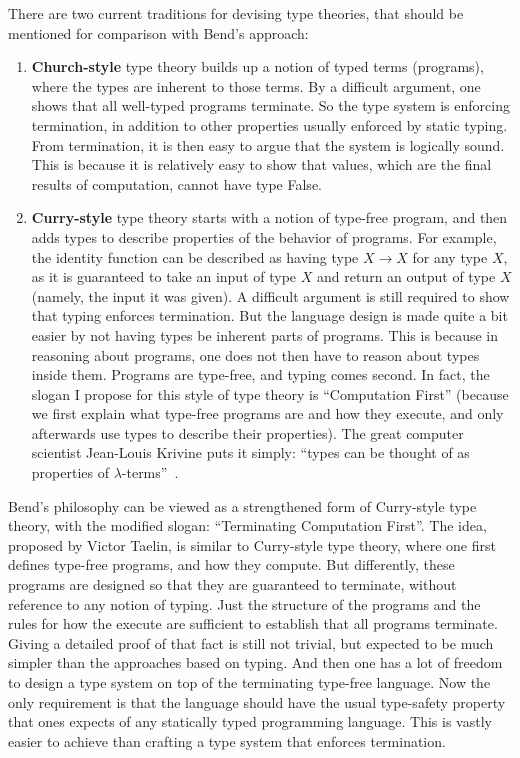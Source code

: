 \documentclass{article}
\begin{document}
There are two current traditions for devising type theories, that
should be mentioned for comparison with Bend's approach:

\begin{enumerate}
\item \textbf{Church-style} type theory builds up a notion of typed
  terms (programs), where the types are inherent to those terms.  By a
  difficult argument, one shows that all well-typed programs
  terminate.  So the type system is enforcing termination, in addition
  to other properties usually enforced by static typing.  From
  termination, it is then easy to argue that the system is logically
  sound.  This is because it is relatively easy to show that values,
  which are the final results of computation, cannot have type False.

\item \textbf{Curry-style} type theory starts with a notion of
  type-free program, and then adds types to describe properties of the
  behavior of programs.  For example, the identity function can be
  described as having type $X \to X$ for any type $X$, as it is
  guaranteed to take an input of type $X$ and return an output of type
  $X$ (namely, the input it was given).  A difficult argument is still
  required to show that typing enforces termination.  But the language
  design is made quite a bit easier by not having types be inherent
  parts of programs.  This is because in reasoning about programs,
  one does not then have to reason about types inside them.  Programs
  are type-free, and typing comes second.  In fact, the slogan I propose
  for this style of type theory is ``Computation First'' (because we
  first explain what type-free programs are and how they execute, and
  only afterwards use types to describe their properties).  The great
  computer scientist Jean-Louis Krivine puts it simply: ``types can
  be thought of as properties of $\lambda$-terms''~\cite[page 43]{krivine93}.
\end{enumerate}

Bend's philosophy can be viewed as a strengthened form of Curry-style
type theory, with the modified slogan: ``Terminating Computation
First''.  The idea, proposed by Victor Taelin, is similar to
Curry-style type theory, where one first defines type-free programs,
and how they compute.  But differently, these programs are designed so
that they are guaranteed to terminate, without reference to any notion
of typing.  Just the structure of the programs and the rules for how
the execute are sufficient to establish that all programs terminate.
Giving a detailed proof of that fact is still not trivial, but
expected to be much simpler than the approaches based on typing.  And
then one has a lot of freedom to design a type system on top of the
terminating type-free language.  Now the only requirement is that the
language should have the usual type-safety property that ones expects
of any statically typed programming language. This is vastly easier to
achieve than crafting a type system that enforces termination.
\end{document}
